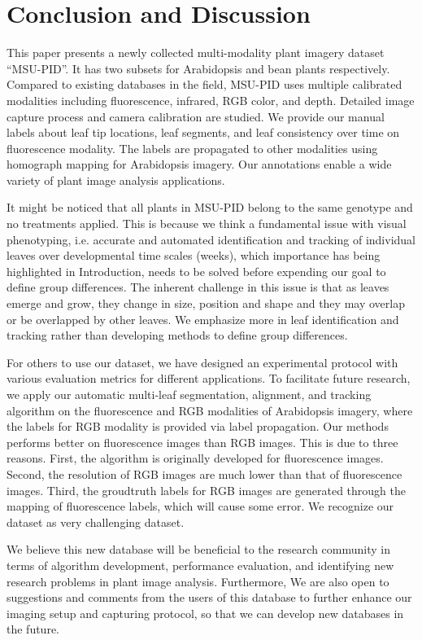 \section{Conclusion and Discussion}

This paper presents a newly collected multi-modality plant imagery dataset ``MSU-PID''.
It has two subsets for Arabidopsis and bean plants respectively. 
Compared to existing databases in the field, MSU-PID uses multiple calibrated modalities including fluorescence, infrared, RGB color, and depth. 
Detailed image capture process and camera calibration are studied. 
We provide our manual labels about leaf tip locations, leaf segments, and leaf consistency over time on fluorescence modality. 
The labels are propagated to other modalities using homograph mapping for Arabidopsis imagery. 
Our annotations enable a wide variety of plant image analysis applications. 

It might be noticed that all plants in MSU-PID belong to the same genotype and no treatments applied.
This is because we think a fundamental issue with visual phenotyping, i.e. accurate and automated identification and tracking of individual leaves over developmental time scales (weeks), which importance has being highlighted in Introduction, needs to be solved before expending our goal to define group differences.
The inherent challenge in this issue is that as leaves emerge and grow, they change in size, position and shape and they may overlap or be overlapped by other leaves.
We emphasize more in leaf identification and tracking rather than developing methods to define group differences.

For others to use our dataset, we have designed an experimental protocol with various evaluation metrics for different applications.  
To facilitate future research, we apply our automatic multi-leaf segmentation, alignment, and tracking algorithm on the fluorescence and RGB modalities of Arabidopsis imagery, where the labels for RGB modality is provided via label propagation. 
Our methods performs better on fluorescence images than RGB images. 
This is due to three reasons. 
First, the algorithm is originally developed for fluorescence images. 
Second, the resolution of RGB images are much lower than that of fluorescence images. 
Third, the groudtruth labels for RGB images are generated through the mapping of fluorescence labels, which will cause some error. 
We recognize our dataset as very challenging dataset. 

We believe this new database will be beneficial to the research community in terms of algorithm development, performance evaluation, and identifying new research problems in plant image analysis.
Furthermore, We are also open to suggestions and comments from the users of this database to further enhance our imaging setup and capturing protocol, so that we can develop new databases in the future.

